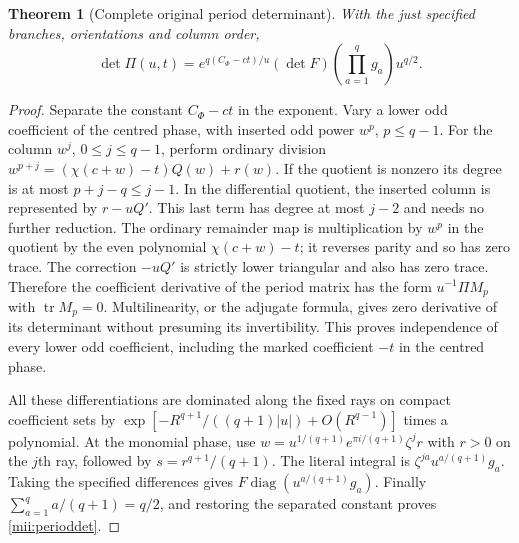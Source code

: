 \documentclass[11pt]{article}
\newtheorem{theorem}{Theorem}
\newcommand{\tr}{\operatorname{tr}}
\newcommand{\diag}{\operatorname{diag}}
\begin{document}
\begin{theorem}[Complete original period determinant]\label{mii:periodtheorem}
With the just specified branches, orientations and column order,
\begin{equation}\tag{MII27}\label{mii:perioddet}
 \det\Pi(u,t)=
 e^{q(C_\Phi-ct)/u}(\det F)
                 \left(\prod_{a=1}^qg_a\right)u^{q/2}.
\end{equation}
\end{theorem}
\begin{proof}
Separate the constant $C_\Phi-ct$ in the exponent. Vary a lower
odd coefficient of the centred phase, with inserted odd power
$w^p$, $p\le q-1$. For the column $w^j$, $0\le j\le q-1$,
perform ordinary division
$w^{p+j}=(\chi(c+w)-t)Q(w)+r(w)$. If the quotient is nonzero
its degree is at most $p+j-q\le j-1$. In the differential
quotient, the inserted column is represented by
$r-uQ'$. This last term has degree at most $j-2$ and needs no
further reduction. The ordinary remainder map is multiplication
by $w^p$ in the quotient by the even polynomial $\chi(c+w)-t$;
it reverses parity and so has zero trace. The correction
$-uQ'$ is strictly lower triangular and also has zero trace.
Therefore the coefficient derivative of the period matrix has
the form $u^{-1}\Pi M_p$ with $\tr M_p=0$. Multilinearity, or
the adjugate formula, gives zero derivative of its determinant
without presuming its invertibility. This proves independence
of every lower odd coefficient, including the marked coefficient
$-t$ in the centred phase.

All these differentiations are dominated along the fixed rays
on compact coefficient sets by
$\exp[-R^{q+1}/((q+1)|u|)+O(R^{q-1})]$ times a polynomial.
At the monomial phase, use
$w=u^{1/(q+1)}e^{\pi i/(q+1)}\zeta^j r$ with $r>0$ on the
$j$th ray, followed by $s=r^{q+1}/(q+1)$. The literal integral
is $\zeta^{ja}u^{a/(q+1)}g_a$. Taking the specified differences
gives $F\diag(u^{a/(q+1)}g_a)$. Finally
$\sum_{a=1}^q a/(q+1)=q/2$, and restoring the separated
constant proves \eqref{mii:perioddet}.
\end{proof}
\end{document}
